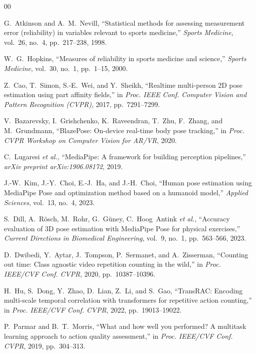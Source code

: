 \documentclass[conference]{IEEEtran}
\begin{document}
\begin{thebibliography}{00}

G.~Atkinson and A.~M.~Nevill, ``Statistical methods for assessing measurement error (reliability) in variables relevant to sports medicine,'' \textit{Sports Medicine}, vol.~26, no.~4, pp.~217--238, 1998.

W.~G.~Hopkins, ``Measures of reliability in sports medicine and science,'' \textit{Sports Medicine}, vol.~30, no.~1, pp.~1--15, 2000.

Z.~Cao, T.~Simon, S.-E.~Wei, and Y.~Sheikh, ``Realtime multi-person 2D pose estimation using part affinity fields,'' in \textit{Proc. IEEE Conf. Computer Vision and Pattern Recognition (CVPR)}, 2017, pp.~7291--7299.

V.~Bazarevsky, I.~Grishchenko, K.~Raveendran, T.~Zhu, F.~Zhang, and M.~Grundmann, ``BlazePose: On-device real-time body pose tracking,'' in \textit{Proc. CVPR Workshop on Computer Vision for AR/VR}, 2020.

C.~Lugaresi \textit{et al.}, ``MediaPipe: A framework for building perception pipelines,'' \textit{arXiv preprint arXiv:1906.08172}, 2019.

J.-W.~Kim, J.-Y.~Choi, E.-J.~Ha, and J.-H.~Choi, ``Human pose estimation using MediaPipe Pose and optimization method based on a humanoid model,'' \textit{Applied Sciences}, vol.~13, no.~4, 2023.

S.~Dill, A.~R\"{o}sch, M.~Rohr, G.~G\"{u}ney, C.~Hoog~Antink \textit{et al.}, ``Accuracy evaluation of 3D pose estimation with MediaPipe Pose for physical exercises,'' \textit{Current Directions in Biomedical Engineering}, vol.~9, no.~1, pp.~563--566, 2023.

D.~Dwibedi, Y.~Aytar, J.~Tompson, P.~Sermanet, and A.~Zisserman, ``Counting out time: Class agnostic video repetition counting in the wild,'' in \textit{Proc. IEEE/CVF Conf. CVPR}, 2020, pp.~10387--10396.

H.~Hu, S.~Dong, Y.~Zhao, D.~Lian, Z.~Li, and S.~Gao, ``TransRAC: Encoding multi-scale temporal correlation with transformers for repetitive action counting,'' in \textit{Proc. IEEE/CVF Conf. CVPR}, 2022, pp.~19013--19022.

P.~Parmar and B.~T.~Morris, ``What and how well you performed? A multitask learning approach to action quality assessment,'' in \textit{Proc. IEEE/CVF Conf. CVPR}, 2019, pp.~304--313.


\end{thebibliography}
\end{document}
